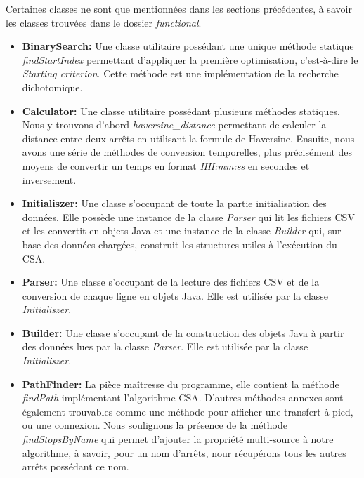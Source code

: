 \documentclass[12pt]{article}
\begin{document}
Certaines classes ne sont que mentionnées dans les sections précédentes, à savoir les classes trouvées dans le dossier \emph{functional}.
\begin{itemize}
  \item \textbf{BinarySearch: } Une classe utilitaire possédant une unique méthode statique \emph{findStartIndex} permettant d'appliquer la première optimisation, c'est-à-dire
                                le \emph{Starting criterion}. Cette méthode est une implémentation de la recherche dichotomique.
  \item \textbf{Calculator: }   Une classe utilitaire possédant plusieurs méthodes statiques. Nous y trouvons d'abord \emph{haversine\_distance} permettant de calculer la distance entre deux arrêts
                                en utilisant la formule de Haversine. Ensuite, nous avons une série de méthodes de conversion temporelles, plus précisément des moyens de convertir un temps
                                en format \emph{HH:mm:ss} en secondes et inversement.
  \item \textbf{Initialiszer: } Une classe s'occupant de toute la partie initialisation des données. Elle possède une instance de la classe \emph{Parser} qui lit les fichiers CSV et les convertit
                                en objets Java et une instance de la classe \emph{Builder} qui, sur base des données chargées, construit les structures utiles à l'exécution du CSA.
  \item \textbf{Parser: }       Une classe s'occupant de la lecture des fichiers CSV et de la conversion de chaque ligne en objets Java. Elle est utilisée par la classe \emph{Initialiszer}.
  \item \textbf{Builder: }      Une classe s'occupant de la construction des objets Java à partir des données lues par la classe \emph{Parser}. Elle est utilisée par la classe \emph{Initialiszer}.
  \item \textbf{PathFinder: }   La pièce maîtresse du programme, elle contient la méthode \emph{findPath} implémentant l'algorithme CSA. D'autres méthodes annexes sont également trouvables comme
                                une méthode pour afficher une transfert à pied, ou une connexion. Nous soulignons la présence de la méthode \emph{findStopsByName} qui permet d'ajouter
                                la propriété multi-source à notre algorithme, à savoir, pour un nom d'arrêts, nour récupérons tous les autres arrêts possédant ce nom.
\end{itemize} 
\end{document}
